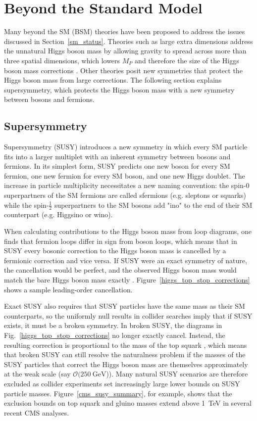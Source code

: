 \section{Beyond the Standard Model}
Many beyond the SM (BSM) theories have been proposed to address the issues discussed in Section~\ref{sm_status}. Theories such as large extra dimensions address the unnatural Higgs boson mass by allowing gravity to spread across more than three spatial dimensions, which lowers $M_P$ and therefore the size of the Higgs boson mass corrections \cite{add}. Other theories posit new symmetries that protect the Higgs boson mass from large corrections. The following section explains supersymmetry, which protects the Higgs boson mass with a new symmetry between bosons and fermions.

\subsection{Supersymmetry}
\label{susy}
Supersymmetry (SUSY) introduces a new symmetry in which every SM particle fits into a larger multiplet with an inherent symmetry between bosons and fermions. In its simplest form, SUSY predicts one new boson for every SM fermion, one new fermion for every SM boson, and one new Higgs doublet. The increase in particle multiplicity necessitates a new naming convention: the spin-0 superpartners of the SM fermions are called sfermions (e.g. sleptons or squarks) while the spin-$\frac{1}{2}$ superpartners to the SM bosons add "ino" to the end of their SM counterpart (e.g. Higgsino or wino).

When calculating contributions to the Higgs boson mass from loop diagrams, one finds that fermion loops differ in sign from boson loops, which means that in SUSY every bosonic correction to the Higgs boson mass is cancelled by a fermionic correction and vice versa. If SUSY were an exact symmetry of nature, the cancellation would be perfect, and the observed Higgs boson mass would match the bare Higgs boson mass exactly \cite{susy_primer}. Figure~\ref{higgs_top_stop_corrections} shows a sample leading-order cancellation.



Exact SUSY also requires that SUSY particles have the same mass as their SM counterparts, so the uniformly null results in collider searches imply that if SUSY exists, it must be a broken symmetry. In broken SUSY, the diagrams in Fig.~\ref{higgs_top_stop_corrections} no longer exactly cancel. Instead, the resulting correction is proportional to the mass of the top squark \cite{craig_susy_run1}, which means that broken SUSY can still resolve the naturalness problem if the masses of the SUSY particles that correct the Higgs boson mass are themselves approximately at the weak scale (say $\mathcal{O}(\SI{250}{\GeV}$)). Many natural SUSY scenarios are therefore excluded as collider experiments set increasingly large lower bounds on SUSY particle masses. Figure~\ref{cms_susy_summary}, for example, shows that the exclusion bounds on top squark and gluino masses extend above \SI{1}{\TeV} in several recent CMS analyses. 

